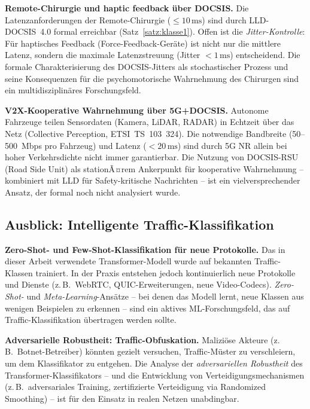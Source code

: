 ﻿\documentclass[a4paper,12pt]{article}
\theoremstyle{definition}
\begin{document}
\textbf{Remote-Chirurgie und haptic feedback \"{u}ber DOCSIS.}
Die Latenzanforderungen der Remote-Chirurgie ($\leq 10\,\mathrm{ms}$) sind durch
LLD-DOCSIS~4.0 formal erreichbar (Satz~\ref{satz:klasse1}). Offen ist die
\emph{Jitter-Kontrolle}: F\"{u}r haptisches Feedback (Force-Feedback-Ger\"{a}te)
ist nicht nur die mittlere Latenz, sondern die maximale Latenzstreuung
(Jitter $< 1\,\mathrm{ms}$) entscheidend. Die formale Charakterisierung des
DOCSIS-Jitters als stochastischer Prozess und seine Konsequenzen f\"{u}r die
psychomotorische Wahrnehmung des Chirurgen sind ein multidisziplin\"{a}res
Forschungsfeld.

\textbf{V2X-Kooperative Wahrnehmung \"{u}ber 5G+DOCSIS.}
Autonome Fahrzeuge teilen Sensordaten (Kamera, LiDAR, RADAR) in Echtzeit
\"{u}ber das Netz (Collective Perception, ETSI~TS~103~324). Die notwendige
Bandbreite (50--500~Mbps pro Fahrzeug) und Latenz ($< 20\,\mathrm{ms}$) sind
durch 5G NR allein bei hoher Verkehrsdichte nicht immer garantierbar.
Die Nutzung von DOCSIS-RSU (Road Side Unit) als stationÃ¤rem Ankerpunkt
f\"{u}r kooperative Wahrnehmung -- kombiniert mit LLD f\"{u}r Safety-kritische
Nachrichten -- ist ein vielversprechender Ansatz, der formal noch nicht
analysiert wurde.

\subsection{Ausblick: Intelligente Traffic-Klassifikation}

\textbf{Zero-Shot- und Few-Shot-Klassifikation f\"{u}r neue Protokolle.}
Das in dieser Arbeit verwendete Transformer-Modell wurde auf bekannten
Traffic-Klassen trainiert. In der Praxis entstehen jedoch kontinuierlich
neue Protokolle und Dienste (z.\,B.\ WebRTC, QUIC-Erweiterungen, neue
Video-Codecs). \emph{Zero-Shot-} und \emph{Meta-Learning}-Ans\"{a}tze
-- bei denen das Modell lernt, neue Klassen aus wenigen Beispielen zu
erkennen -- sind ein aktives ML-Forschungsfeld, das auf Traffic-Klassifikation
\"{u}bertragen werden sollte.

\textbf{Adversarielle Robustheit: Traffic-Obfuskation.}
Malizi\"{o}se Akteure (z.\,B.\ Botnet-Betreiber) k\"{o}nnten gezielt versuchen,
Traffic-M\"{u}ster zu verschleiern, um dem Klassifikator zu entgehen. Die
Analyse der \emph{adversariellen Robustheit} des Transformer-Klassifikators
-- und die Entwicklung von Verteidigungsmechanismen (z.\,B.\ adversariales
Training, zertifizierte Verteidigung via Randomized Smoothing) -- ist f\"{u}r
den Einsatz in realen Netzen unabdingbar.
\end{document}
